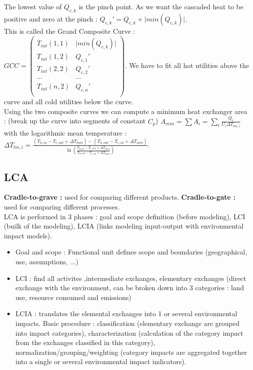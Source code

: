 \documentclass[../main.tex]{subfiles}
\begin{document}
\warning The lowest value of $Q_{c,k}$ is the pinch point. As we want the cascaded heat to be positive and zero at the pinch : $Q_{c,k}' = Q_{c,k} + \lvert min(Q_{c,k}) \rvert$.\\
This is called the Grand Composite Curve : $GCC = \begin{pmatrix}
    T_{int}(1,1) & \lvert min(Q_{c,k}) \rvert\\ T_{int}(1,2) & Q_{c,1}'\\ T_{int}(2,2) & Q_{c,2}'\\ \cdots &\cdots\\ T_{int}(n,2) & Q_{c,n}'\\
\end{pmatrix}$. We have to fit all hot utilities above the curve and all cold utilities below the curve. \\

Using the two composite curves we can compute a minimum heat exchanger area : (break up the curve into segments of constant $C_p$) $A_{min} = \sum A_i = \sum_i \frac{Q_i}{U_i \Delta T_{lm,i}}$ with the logarithmic mean temperature : $\Delta T_{lm,i} = \frac{(T_{h,in} -T_{c,out} + \Delta T_{min}) - (T_{h,out} - T_{c,in} + \Delta T_{min})}{\ln(\frac{T_{h,in}-T_{c,out} + \Delta T_{min}}{T_{h,out} - T_{c,in} + \Delta T_{min}})}$.\\

\subsection{LCA}
\textbf{Cradle-to-grave :} used for comparing different products. \textbf{Cradle-to-gate :} used for comparing different processes. \\
LCA is performed in 3 phases : goal and scope definition (before modeling), LCI (builk of the modeling), LCIA (links modeling input-output with environmental impact models).\\

\begin{itemize}
    \item Goal and scope : Functional unit defines scope and boundaries (geographical, use, assumptions, ...)
    \item LCI : find all activites ,intermediate exchanges, elementary exchanges (direct exchange with the environment, can be broken down into 3 categories : land use, resource consumed and emissions)
    \item LCIA : translates the elemental exchanges into 1 or several environmental impacts. Basic procedure : classification (elementary exchange are grouped into impact categories), characterization (calculation of the category impact from the exchanges classified in this category), normalization/grouping/weighting (category impacts are aggregated together into a single or several environmental impact indicators).
\end{itemize}
\end{document}

